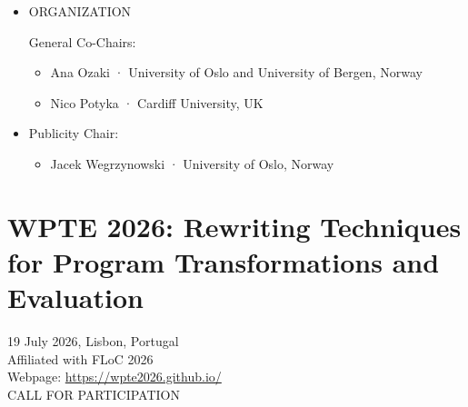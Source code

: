 \documentclass[prodmode,acmtecs]{acmsmall} %
\begin{document}
\begin{itemize}
\item  ORGANIZATION 
 
  General Co-Chairs: 
 
\begin{itemize}\item  Ana Ozaki · University of Oslo and University of Bergen, Norway
\item  Nico Potyka · Cardiff University, UK
\end{itemize} 
\item  Publicity Chair: 
 
\begin{itemize}\item  Jacek Wegrzynowski · University of Oslo, Norway
\end{itemize} 
\end{itemize}\section{WPTE 2026: Rewriting Techniques for Program Transformations and Evaluation}\label{WPTE2026}  19 July 2026, Lisbon, Portugal\\ 
  Affiliated with FLoC 2026\\ 
  Webpage: \href{https://wpte2026.github.io/}{https://wpte2026.github.io/}\\ 
CALL FOR PARTICIPATION 
\end{document}

